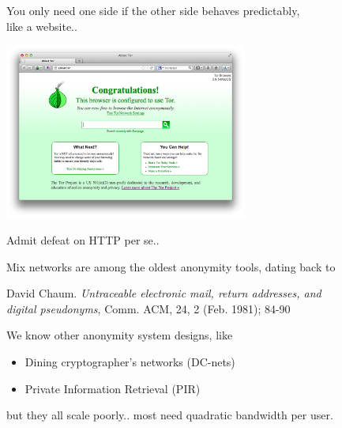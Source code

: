 \documentclass[fleqn,xcolor={usenames,dvipsnames},notes,aspectratio=169]{beamer} %
\begin{document}
\begin{frame}%
You only need one side if the other side behaves predictably, \\
\hspace*{3pt} like a website.. \hspace*{3pt} \\
\smallskip

\begin{center}
\includegraphics[width=0.6\textwidth]{pics/tor/Tor_screenshot}
\end{center}
\smallskip

Admit defeat on HTTP per se.. \hspace*{3pt}
\end{frame}




\begin{frame}

Mix networks are among the oldest anonymity tools, dating back to \\ \medskip

\hspace*{3pt} David Chaum. {\em Untraceable electronic mail, return addresses, and \\
\hspace*{3pt} digital pseudonyms}, Comm. ACM, 24, 2 (Feb. 1981); 84-90

\medskip\bigskip\bigskip

We know other anonymity system designs, like
\begin{itemize}
\item Dining cryptographer's networks (DC-nets)
\item Private Information Retrieval (PIR) 
\end{itemize}
but they all scale poorly.. %
 most need quadratic bandwidth per user.
\end{frame}
\end{document}
